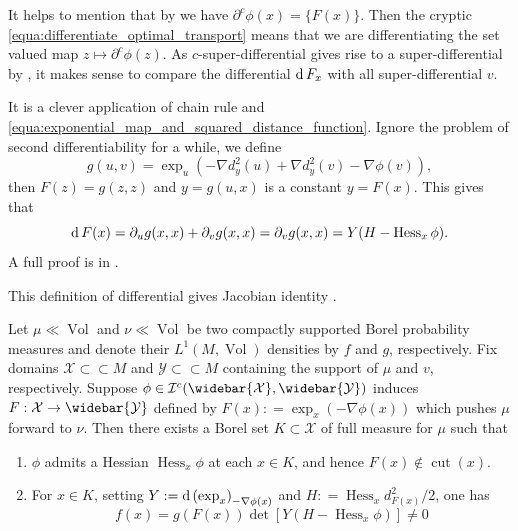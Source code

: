 It helps to mention that by  we have
$\partial^c \phi (x) = \{ F(x) \}$.
Then the cryptic \cref{equa:differentiate_optimal_transport} means that we are differentiating
the set valued map $z \mapsto \partial^c \phi(z)$.
As $c$-super-differential gives rise to a super-differential by ,
it makes sense to compare the differential $\operatorname{d} F_x$ with all super-differential $v$.
\begin{rmk}

	It is a clever application of chain rule and \cref{equa:exponential_map_and_squared_distance_function}.
	Ignore the problem of second differentiability for a while, we define
	\[
		g(u,v) = \exp_{u}(-\nabla d_y^2(u) + \nabla d_y^2(v) - \nabla \phi (v)),
	\]
	then $F(z) = g(z, z)$ and $ y = g(u, x) $ is a constant $y = F(x)$.
	This gives that
	\[
		\operatorname{d} F(x) = \partial_u g(x, x) + \partial_v g(x, x) = \partial_v g(x, x) = Y(H - \operatorname{Hess}_x \phi).
	\]
	A full proof is in \cite[Proposition 4.1]{cordero2001riemannian}.
\end{rmk}

This definition of differential gives Jacobian identity \cite[Theorem 4.2]{cordero2001riemannian}.

\begin{thm}
	\label{thm:jacobian_identity}
	Let \( \mu \ll \operatorname{Vol} \) and \( \nu \ll \operatorname{Vol} \) be
	two compactly supported Borel probability measures and denote their
	\( L ^ { 1 } ( M, \operatorname{Vol}) \) densities by \( f \) and \( g \), respectively.
	Fix domains \( \mathcal{X} \subset \subset M \) and \( \mathcal{Y} \subset \subset M \) containing the support of \( \mu \) and \( v \), respectively.
	Suppose \( \phi \in \mathcal{I} ^ { c } ( \widebar { \mathcal{X} } , \widebar { \mathcal{Y} } ) \) induces
	\( F : \mathcal{X} \rightarrow \widebar { \mathcal{Y} } \) defined by \( F ( x ) : = \exp _ { x } ( - \nabla \phi ( x ) ) \)
	which pushes \( \mu \) forward to $\nu$.
	Then there exists a Borel set \( K \subset \mathcal{X} \) of full
	measure for \( \mu \) such that
	\begin{enumerate}
		\item $\phi$ admits a Hessian \( \operatorname { Hess } _ { x } \phi \) at each \( x \in K \), and hence \( F ( x ) \notin \operatorname { cut } ( x ) \).
		\item For \( x \in K \), setting \( Y : = \operatorname{d} \left( \exp _ { x } \right) _ { - \nabla \phi ( x ) } \) and \( H : = \operatorname { Hess } _ { x } d _ { F ( x ) } ^ { 2 } / 2 \), one
		      has
		      \[ f ( x ) = g ( F ( x ) ) \operatorname { det } \left[ Y \left( H - \operatorname { Hess } _ { x } \phi \right) \right] \neq 0 \]
	\end{enumerate}
\end{thm}

